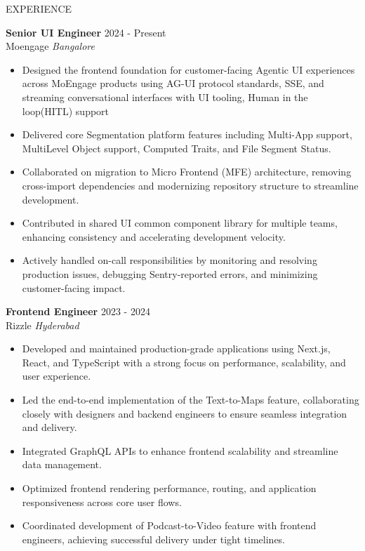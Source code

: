 \documentclass{resume} %
\begin{document}
\begin{rSection}{EXPERIENCE}


\textbf{Senior UI Engineer} \hfill 2024 - Present\\
Moengage \hfill \textit{Bangalore}
 \begin{itemize}
    \itemsep -3pt {} 
     \item Designed the frontend foundation for customer-facing Agentic UI experiences across MoEngage products using AG-UI protocol standards, SSE, and streaming conversational interfaces with UI tooling, Human in the loop(HITL) support
    \item Delivered core Segmentation platform features including Multi-App support, MultiLevel Object support, Computed Traits, and File Segment Status.
    \item Collaborated on migration to Micro Frontend (MFE) architecture, removing cross-import dependencies and modernizing repository structure to streamline development.
    \item Contributed in shared UI common component library for multiple teams, enhancing consistency and accelerating development velocity.
    \item Actively handled on-call responsibilities by monitoring and resolving production issues, debugging Sentry-reported errors, and minimizing customer-facing impact.
 \end{itemize}

\textbf{Frontend Engineer} \hfill 2023 - 2024\\
Rizzle \hfill \textit{Hyderabad}
 \begin{itemize}
    \item Developed and maintained production-grade applications using Next.js, React, and TypeScript with a strong focus on performance, scalability, and user experience.
    \item Led the end-to-end implementation of the Text-to-Maps feature, collaborating closely with designers and backend engineers to ensure seamless integration and delivery.
    \item Integrated GraphQL APIs to enhance frontend scalability and streamline data management.
    \item Optimized frontend rendering performance, routing, and application responsiveness across core user flows.
    \item Coordinated development of Podcast-to-Video feature with frontend engineers, achieving successful delivery under tight timelines.
 \end{itemize}


\end{rSection}
\end{document}
